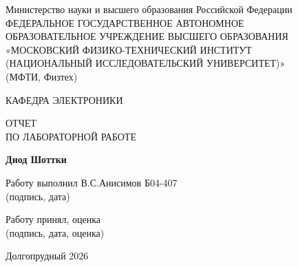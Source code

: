 \documentclass[12pt]{article}
\begin{document}
\begin{center}

\large
Министерство науки и высшего образования Российской Федерации \\
\large
ФЕДЕРАЛЬНОЕ ГОСУДАРСТВЕННОЕ АВТОНОМНОЕ \\
ОБРАЗОВАТЕЛЬНОЕ УЧРЕЖДЕНИЕ ВЫСШЕГО ОБРАЗОВАНИЯ \\
\large
«МОСКОВСКИЙ ФИЗИКО-ТЕХНИЧЕСКИЙ ИНСТИТУТ \\
(НАЦИОНАЛЬНЫЙ ИССЛЕДОВАТЕЛЬСКИЙ УНИВЕРСИТЕТ)» \\
(МФТИ, Физтех)

\vspace{4cm}

\large
КАФЕДРА ЭЛЕКТРОНИКИ

\vspace{0.7cm}

\Large
ОТЧЕТ \\
ПО ЛАБОРАТОРНОЙ РАБОТЕ

\vspace{0.7cm}

\large
\textbf{Диод Шоттки}

\vfill

\noindent
Работу выполнил \hfill \underline{\hspace{6cm}} В.С.Анисимов Б04-407 \\
\hfill \small{(подпись, дата)}\par

\vspace{3cm}

\noindent
Работу принял, оценка \hfill \underline{\hspace{6cm}} \\
\hfill \small{(подпись, дата, оценка)}

\vfill

Долгопрудный 2026

\end{center}
\end{document}
